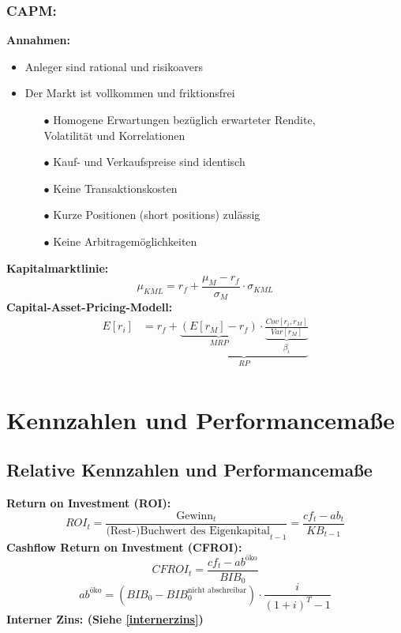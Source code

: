 \documentclass[leqno]{scrartcl}
\begin{document}
\begin{multicols}{4}
\subsubsection{CAPM:}
\textbf{Annahmen:}
  \begin{itemize}
    \item Anleger sind rational und risikoavers
    \item Der Markt ist vollkommen und friktionsfrei
    \begin{itemize}
      \item[$\bullet$] Homogene Erwartungen bezüglich erwarteter Rendite,\\ Volatilität und Korrelationen 
      \item[$\bullet$] Kauf- und Verkaufspreise sind identisch
      \item[$\bullet$] Keine Transaktionskosten
      \item[$\bullet$] Kurze Positionen (short positions) zulässig
      \item[$\bullet$] Keine Arbitragemöglichkeiten
    \end{itemize}
  \end{itemize} 
\textbf{Kapitalmarktlinie:}
  \begin{equation*}
    \mu_{KML} = r_f + \frac{\mu_M - r_f}{\sigma_M}\cdot \sigma_{KML}
  \end{equation*}
\textbf{Capital-Asset-Pricing-Modell:}
  \begin{equation*}
    \begin{split}
      E[r_i] &= r_f +  \underbrace{\underbrace{(E[r_M] - r_f)}_{MRP} \cdot \underbrace{\frac{Cov[r_i,r_M]}{Var[r_M]}}_{\beta_i}}_{RP}\\
    \end{split}
  \end{equation*}


\section{Kennzahlen und Performancemaße}

\subsection{Relative Kennzahlen und Performancemaße}

\textbf{Return on Investment (ROI):}
  \begin{equation*}
    ROI_t = \frac{\text{Gewinn}_t}{\text{(Rest-)Buchwert des Eigenkapital}_{t-1}} = \frac{cf_t-ab_t}{KB_{t-1}}
  \end{equation*}
\textbf{Cashflow Return on Investment (CFROI):}
  \begin{equation*}
    CFROI_t = \frac{cf_t-ab^{\text{öko}}}{BIB_0}
  \end{equation*}
  \begin{equation*}
    ab^{\text{öko}} = (BIB_0 - BIB^{\text{nicht abschreibar}}_0) \cdot \frac{i}{(1+i)^T-1}
  \end{equation*}
\textbf{Interner Zins: (Siehe \ref{internerzins})}
  

\end{multicols}
\end{document}
